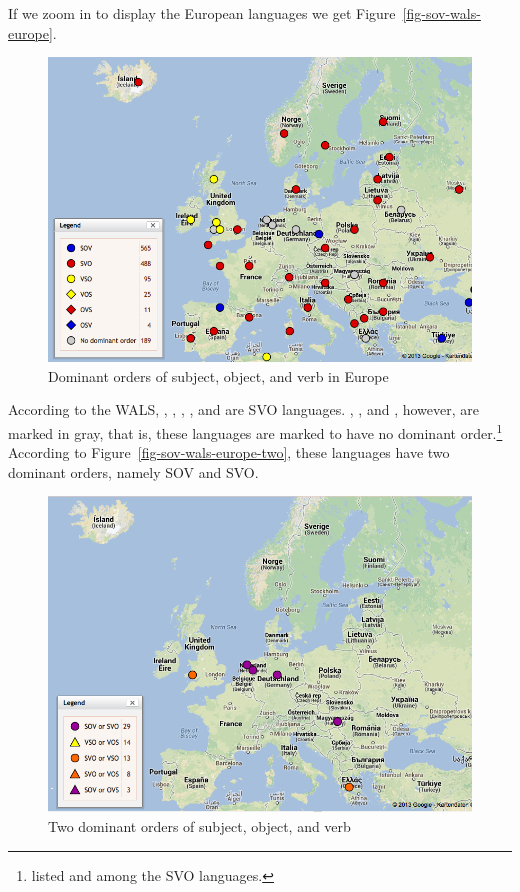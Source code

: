 If we zoom in to display the European languages we get Figure~\vref{fig-sov-wals-europe}.
\begin{figure}
\includegraphics[width=.898\textwidth]{Pictures/WALS-SOV-Europa}
\caption{\label{fig-sov-wals-europe}Dominant orders of subject, object, and verb in Europe}
\end{figure}
According to the WALS, , , , , and  are SVO
languages. , , and , however, are marked in gray, that is, these languages are
marked to have no dominant order.\footnote{
  \citet[]{Greenberg63a-u} listed  and  among the SVO languages.%
} According to Figure~\vref{fig-sov-wals-europe-two}, these languages
have two dominant orders, namely SOV and SVO.
\begin{figure}
\includegraphics[width=.898\textwidth]{Pictures/WALS-SOV-Europa-no-dominant}
\caption{\label{fig-sov-wals-europe-two}%
Two dominant orders of subject, object, and verb \citep[Section~3]{Dryer2013c}}
\end{figure}
